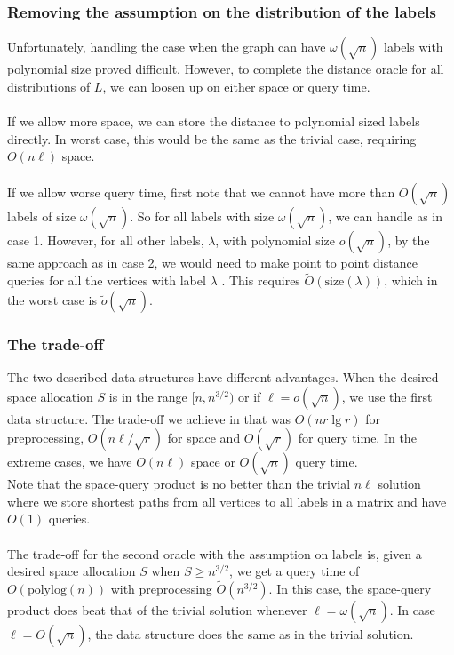 \subsubsection{Removing the assumption on the distribution of the labels}
Unfortunately, handling the case when the graph can have $\omega(\sqrt{n})$ labels with
polynomial size proved difficult. However, to complete the distance oracle for all
distributions of $L$, we can loosen up on either space or query time. \\
\\
If we allow more space, we can store the distance to polynomial sized labels directly. In
worst case, this would be the same as the trivial case, requiring $O(n\ell)$ space. \\
\\
If we allow worse query time, first note that we cannot have more than $O(\sqrt{n})$
labels of size $\omega(\sqrt{n})$. So for all labels with size $\omega(\sqrt{n})$, we can
handle as in case 1. However, for all other labels, $\lambda$, with polynomial size $o(\sqrt{n})$, by the same
approach as in case 2, we would need to make point to point distance queries for all the
vertices with label $\lambda$ . This requires $\tilde{O}(\text{size}(\lambda))$, which in
the worst case is $\tilde{o}(\sqrt{n})$.

\subsubsection{The trade-off}\label{exactoracletrade}
The two described data structures have different advantages. When the desired space
allocation $S$ is in the range $[n,n^{3/2})$ or if $\ell=o(\sqrt{n})$, we use the first
  data structure. The trade-off we achieve in that was $O(nr\lg r)$ for preprocessing,
  $O(n\ell/\sqrt{r})$ for space and $O(\sqrt{r})$ for query time. In
  the extreme cases, we have $O(n\ell)$ space or $O(\sqrt{n})$ query time.  \\
Note that the space-query product is no better than the trivial $n\ell$ solution where we
store shortest paths from all vertices to all labels in a matrix and have $O(1)$ queries. \\
\\
The trade-off for the second oracle with the
assumption on labels is, given a desired space allocation $S$ when $S\geq n^{3/2}$, we get a
query time of $O(\text{polylog}(n))$ with preprocessing $\tilde{O}(n^{3/2})$. In this
case, the space-query product does beat that of the trivial solution whenever
$\ell=\omega(\sqrt{n})$. In case $\ell=O(\sqrt{n})$, the data structure does the same as
in the trivial solution.
